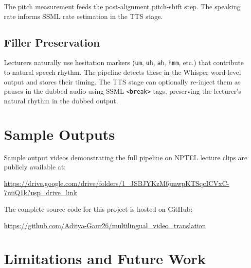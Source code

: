 \documentclass[12pt,a4paper]{article}
\begin{document}
The pitch measurement feeds the post-alignment pitch-shift step.  The
speaking rate informs SSML rate estimation in the TTS stage.

\subsection{Filler Preservation}

Lecturers naturally use hesitation markers (\texttt{um}, \texttt{uh},
\texttt{ah}, \texttt{hmm}, etc.) that contribute to natural speech rhythm.
The pipeline detects these in the Whisper word-level output and stores their
timing.  The TTS stage can optionally re-inject them as pauses in the dubbed
audio using SSML \texttt{<break>} tags, preserving the lecturer's natural
rhythm in the dubbed output.


\section{Sample Outputs}

Sample output videos demonstrating the full pipeline on NPTEL lecture clips
are publicly available at:

\begin{center}
  \url{https://drive.google.com/drive/folders/1_JSBJYKzM6jmwpKTSqcICVxC-7uiiQ1k?usp=drive_link}
\end{center}

\noindent The complete source code for this project is hosted on GitHub:

\begin{center}
  \url{https://github.com/Aditya-Gaur26/multilingual_video_translation}
\end{center}



\section{Limitations and Future Work}
\end{document}
